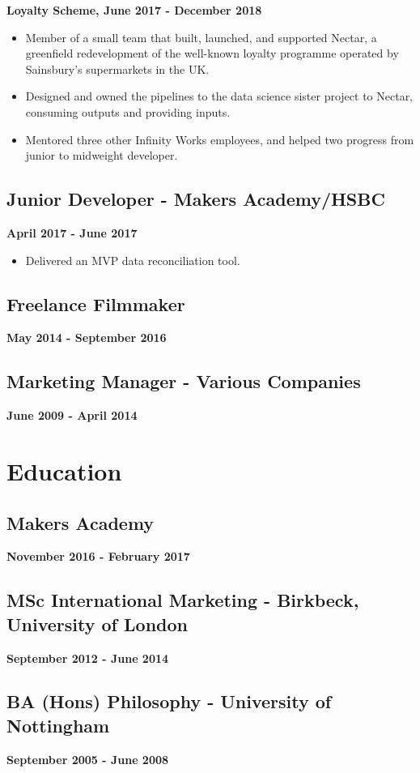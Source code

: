 \documentclass[a4paper]{scrartcl}
\begin{document}
\textbf{Loyalty Scheme, June 2017 - December 2018}
\begin{itemize}
      \item Member of a small team that built, launched, and supported
            Nectar, a greenfield redevelopment of the well-known loyalty
            programme operated by Sainsbury's supermarkets in the UK.
      \item Designed and owned the pipelines to the data science sister project
            to Nectar, consuming outputs and providing inputs.
      \item Mentored three other Infinity Works employees, and helped two
            progress from junior to midweight developer.
\end{itemize}

\subsection*{Junior Developer - Makers Academy/HSBC}
\textbf{April 2017 - June 2017}
\begin{itemize}
      \item Delivered an MVP data reconciliation tool.
\end{itemize}

\subsection*{Freelance Filmmaker}
\textbf{May 2014 - September 2016}

\subsection*{Marketing Manager - Various Companies}
\textbf{June 2009 - April 2014}

\section*{Education}

\subsection*{Makers Academy}
\textbf{November 2016 - February 2017}

\subsection*{MSc International Marketing - Birkbeck, University of London}
\textbf{September 2012 - June 2014}

\subsection*{BA (Hons) Philosophy - University of Nottingham}
\textbf{September 2005 - June 2008}
\end{document}
